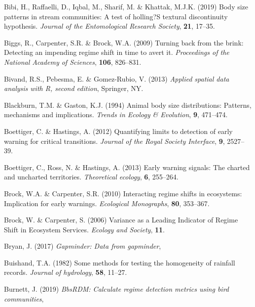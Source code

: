\documentclass[12pt,twoside,openany]{reedthesis}
\begin{document}
\leavevmode\hypertarget{ref-bibi2019body}{}%
Bibi, H., Raffaelli, D., Iqbal, M., Sharif, M. \& Khattak, M.J.K. (2019) Body size patterns in stream communities: A test of holling?S textural discontinuity hypothesis. \emph{Journal of the Entomological Research Society}, \textbf{21}, 17--35.

\leavevmode\hypertarget{ref-biggs2009turning}{}%
Biggs, R., Carpenter, S.R. \& Brock, W.A. (2009) Turning back from the brink: Detecting an impending regime shift in time to avert it. \emph{Proceedings of the National Academy of Sciences}, \textbf{106}, 826--831.

\leavevmode\hypertarget{ref-sp2}{}%
Bivand, R.S., Pebesma, E. \& Gomez-Rubio, V. (2013) \emph{Applied spatial data analysis with R, second edition}, Springer, NY.

\leavevmode\hypertarget{ref-blackburn1994animal}{}%
Blackburn, T.M. \& Gaston, K.J. (1994) Animal body size distributions: Patterns, mechanisms and implications. \emph{Trends in Ecology \& Evolution}, \textbf{9}, 471--474.

\leavevmode\hypertarget{ref-boettiger_quantifying_2012}{}%
Boettiger, C. \& Hastings, A. (2012) Quantifying limits to detection of early warning for critical transitions. \emph{Journal of the Royal Society Interface}, \textbf{9}, 2527--39.

\leavevmode\hypertarget{ref-boettiger_early_2013}{}%
Boettiger, C., Ross, N. \& Hastings, A. (2013) Early warning signals: The charted and uncharted territories. \emph{Theoretical ecology}, \textbf{6}, 255--264.

\leavevmode\hypertarget{ref-brock2010interacting}{}%
Brock, W.A. \& Carpenter, S.R. (2010) Interacting regime shifts in ecosystems: Implication for early warnings. \emph{Ecological Monographs}, \textbf{80}, 353--367.

\leavevmode\hypertarget{ref-brock_variance_2006}{}%
Brock, W. \& Carpenter, S. (2006) Variance as a Leading Indicator of Regime Shift in Ecosystem Services. \emph{Ecology and Society}, \textbf{11}.

\leavevmode\hypertarget{ref-gapminder}{}%
Bryan, J. (2017) \emph{Gapminder: Data from gapminder},

\leavevmode\hypertarget{ref-buishand1982some}{}%
Buishand, T.A. (1982) Some methods for testing the homogeneity of rainfall records. \emph{Journal of hydrology}, \textbf{58}, 11--27.

\leavevmode\hypertarget{ref-bbsRDM}{}%
Burnett, J. (2019) \emph{BbsRDM: Calculate regime detection metrics using bird communities},
\end{document}
